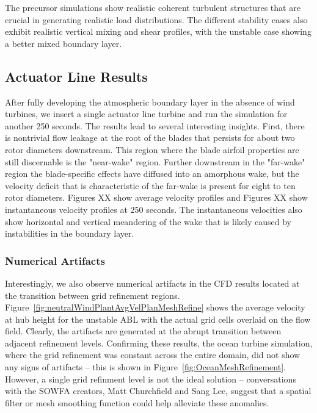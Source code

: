 The precursor simulations show realistic coherent turbulent structures that are crucial in generating realistic load distributions.  The different stability cases also exhibit realistic vertical mixing and shear profiles, with the unstable case showing a better mixed boundary layer.

\subsection{Actuator Line Results}
After fully developing the atmospheric boundary layer in the absence of wind turbines, we insert a single actuator line turbine and run the simulation for another 250 seconds.  The results lead to several interesting insights.  First, there is nontrivial flow leakage at the root of the blades that persists for about two rotor diameters downstream.  This region where the blade airfoil properties are still discernable is the "near-wake" region\cite{sanderse_review_2011}.  Further downstream in the "far-wake" region the blade-specific effects have diffused into an amorphous wake, but the velocity deficit that is characteristic of the far-wake is present for eight to ten rotor diameters.  Figures XX show average velocity profiles and Figures XX show instantaneous velocity profiles at 250 seconds.  The instantaneous velocities also show horizontal and vertical meandering of the wake that is likely caused by instabilities in the boundary layer.

\subsubsection{Numerical Artifacts}
Interestingly, we also observe numerical artifacts in the CFD results located at the transition between grid refinement regions.  Figure~\ref{fig:neutralWindPlantAvgVelPlanMeshRefine} shows the average velocity at hub height for the unstable ABL with the actual grid cells overlaid on the flow field.  Clearly, the artifacts are generated at the abrupt transition between adjacent refinement levels.   Confirming these results, the ocean turbine simulation, where the grid refinement was constant across the entire domain, did not show any signs of artifacts -- this is shown in Figure~\ref{fig:OceanMeshRefinement}. However, a single grid refinment level is not the ideal solution -- conversations with the SOWFA creators, Matt Churchfield and Sang Lee, suggest that a spatial filter or mesh smoothing function could help alleviate these anomalies.

